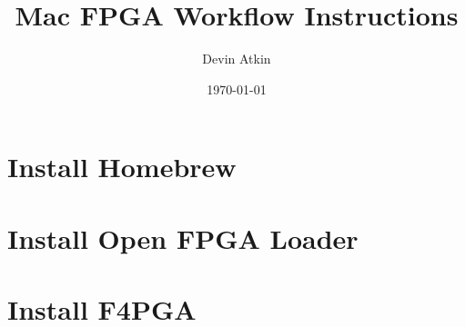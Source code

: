 \documentclass{article}
\title{Mac FPGA Workflow Instructions}
\author{Devin Atkin}
\date{\today}
\begin{document}
\maketitle

\begin{abstract}

\end{abstract}

\section{Install Homebrew}


\section{Install Open FPGA Loader}


\section{Install F4PGA}

\end{document}
